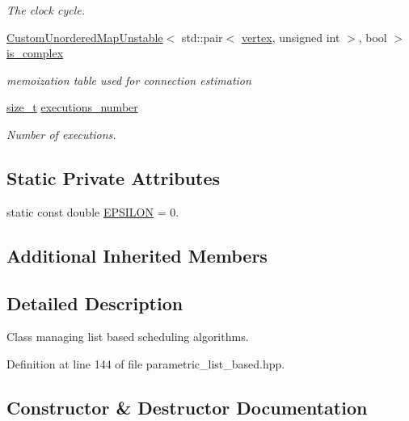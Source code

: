 \begin{DoxyCompactItemize}
\begin{DoxyCompactList}\small\item\em The clock cycle. \end{DoxyCompactList}\item 
\hyperlink{custom__map_8hpp_a8cbaceffc09790a885ec7e9c17809c69}{Custom\+Unordered\+Map\+Unstable}$<$ std\+::pair$<$ \hyperlink{graph_8hpp_abefdcf0544e601805af44eca032cca14}{vertex}, unsigned int $>$, bool $>$ \hyperlink{classparametric__list__based_afe0501bc0000245623bd0064a37f1a60}{is\+\_\+complex}
\begin{DoxyCompactList}\small\item\em memoization table used for connection estimation \end{DoxyCompactList}\item 
\hyperlink{tutorial__fpt__2017_2intro_2sixth_2test_8c_a7c94ea6f8948649f8d181ae55911eeaf}{size\+\_\+t} \hyperlink{classparametric__list__based_a4df4ac930c63d346ceb4e79d6283de11}{executions\+\_\+number}
\begin{DoxyCompactList}\small\item\em Number of executions. \end{DoxyCompactList}\end{DoxyCompactItemize}
\subsection*{Static Private Attributes}
\begin{DoxyCompactItemize}
\item 
static const double \hyperlink{classparametric__list__based_a25940f1c2f39d4ae48464c75e19f89d0}{E\+P\+S\+I\+L\+ON} = 0.
\end{DoxyCompactItemize}
\subsection*{Additional Inherited Members}


\subsection{Detailed Description}
Class managing list based scheduling algorithms. 

Definition at line 144 of file parametric\+\_\+list\+\_\+based.\+hpp.



\subsection{Constructor \& Destructor Documentation}
\mbox{\label{classparametric__list__based_a10067b837be6ed6afd89010346ec51d3}} 
